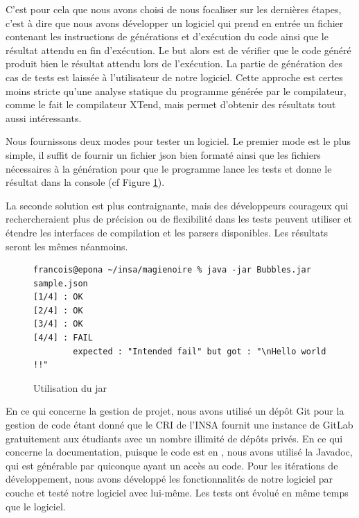 C'est pour cela que nous avons choisi de nous focaliser sur les dernières étapes, c'est à dire que
nous avons développer un logiciel qui prend en entrée un fichier contenant les instructions de générations et d’exécution du code ainsi que le résultat
attendu en fin d’exécution. Le but alors est de vérifier que le code généré produit bien le résultat attendu lors de l’exécution. La partie de génération
des cas de tests est laissée à l'utilisateur de notre logiciel. Cette approche est certes moins stricte qu'une analyse statique du programme générée par
le compilateur, comme le fait le compilateur XTend, mais permet d'obtenir des résultats tout aussi intéressants.

Nous fournissons deux modes pour tester un logiciel. Le premier mode est le plus simple, il suffit de fournir un fichier json bien formaté
ainsi que les fichiers nécessaires à la génération pour que le programme lance les tests et donne le résultat dans la console (cf Figure \ref{mode1}).

La seconde solution est plus contraignante, mais des développeurs courageux qui rechercheraient plus de précision ou de flexibilité dans les tests
peuvent utiliser et étendre les interfaces de compilation et les parsers disponibles. Les résultats seront les mêmes néanmoins.

\begin{figure}[!ht]
\begin{lstlisting}
francois@epona ~/insa/magienoire % java -jar Bubbles.jar sample.json
[1/4] : OK
[2/4] : OK
[3/4] : OK
[4/4] : FAIL
        expected : "Intended fail" but got : "\nHello world !!"
\end{lstlisting}
\caption{Utilisation du jar}
\label{mode1}
\end{figure}


En ce qui concerne la gestion de projet, nous avons utilisé un dépôt Git pour la gestion de code étant donné que le CRI de l'INSA fournit une
instance de GitLab gratuitement aux étudiants avec un nombre illimité de dépôts privés. En ce qui concerne la documentation, puisque le code
est en \jv, nous avons utilisé la Javadoc, qui est générable par quiconque ayant un accès au code. Pour les itérations de développement,
nous avons développé les fonctionnalités de notre logiciel par couche et testé notre logiciel avec lui-même. Les tests ont évolué en même temps que le logiciel.
